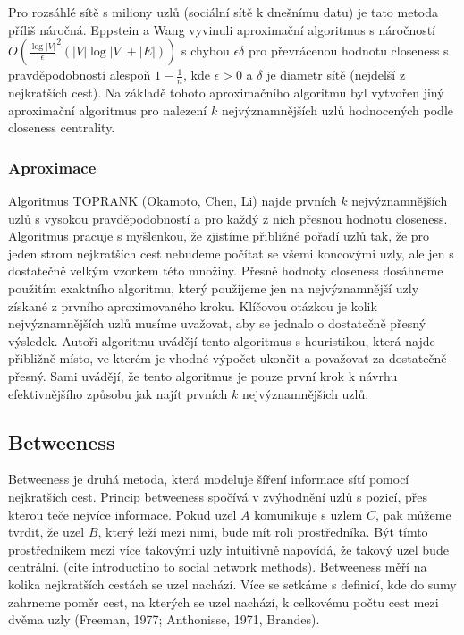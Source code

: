 \documentclass[12pt,titlepage]{report}
\begin{document}
Pro rozsáhlé sítě s miliony uzlů (sociální sítě k dnešnímu datu) je tato
metoda příliš náročná. Eppstein a Wang vyvinuli aproximační algoritmus s
náročností $O(\frac{\log|V|}{\epsilon}^2 (|V| \log |V| + |E|))$ s chybou
$\epsilon \delta$ pro převrácenou hodnotu closeness s pravděpodobností alespoň
$1 - \frac{1}{n}$, kde $\epsilon > 0$ a $\delta$ je diametr sítě (nejdelší z
nejkratších cest). Na základě tohoto aproximačního algoritmu byl vytvořen jiný
aproximační algoritmus pro nalezení $k$ nejvýznamnějších uzlů hodnocených podle
closeness centrality.

\subsubsection{Aproximace}
Algoritmus TOPRANK (Okamoto, Chen, Li) najde prvních $k$ nejvýznamnějších uzlů
s vysokou pravděpodobností a pro každý z nich přesnou hodnotu closeness.
Algoritmus pracuje s myšlenkou, že zjistíme přibližné pořadí uzlů tak, že pro
jeden strom nejkratších cest nebudeme počítat se všemi koncovými uzly, ale jen
s dostatečně velkým vzorkem této množiny.  Přesné hodnoty closeness dosáhneme
použitím exaktního algoritmu, který použijeme jen na nejvýznamnější uzly
získané z prvního aproximovaného kroku. Klíčovou otázkou je kolik
nejvýznamnějších uzlů musíme uvažovat, aby se jednalo o dostatečně přesný
výsledek. Autoři algoritmu uvádějí tento algoritmus s heuristikou, která najde
přibližně místo, ve kterém je vhodné výpočet ukončit a považovat za dostatečně
přesný. Sami uvádějí, že tento algoritmus je pouze první krok k návrhu
efektivnějšího způsobu jak najít prvních $k$ nejvýznamnějších uzlů.

\subsection{Betweeness}
Betweeness je druhá metoda, která modeluje šíření informace sítí pomocí
nejkratších cest. Princip betweeness spočívá v zvýhodnění uzlů s pozicí, přes
kterou teče nejvíce informace. Pokud uzel $A$ komunikuje s uzlem $C$, pak
můžeme tvrdit, že uzel $B$, který leží mezi nimi, bude mít roli prostředníka.
Být tímto prostředníkem mezi více takovými uzly intuitivně napovídá, že takový
uzel bude centrální.  (cite introductino to social network methods).
Betweeness měří na kolika nejkratších cestách se uzel nachází. Více se setkáme
s definicí, kde do sumy zahrneme poměr cest, na kterých se uzel nachází, k
celkovému počtu cest mezi dvěma uzly (Freeman, 1977; Anthonisse, 1971, Brandes).
\end{document}
